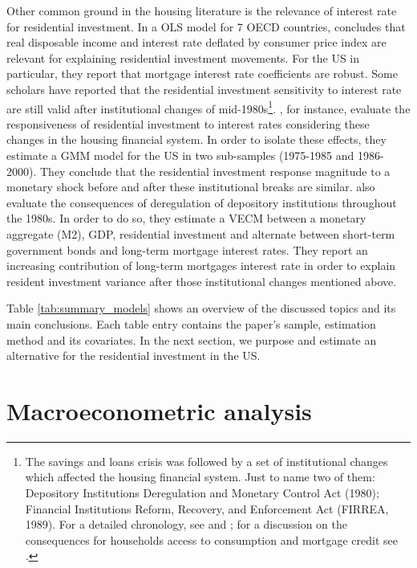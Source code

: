 \documentclass[12pt, a4paper]{article}
\begin{document}
Other common ground in the housing literature is the relevance of interest rate for residential investment.
In a OLS model for 7 OECD countries, \textcite{egebo_1990_MODEL} concludes that real disposable income and interest rate deflated by consumer price index are relevant for explaining residential investment movements.
For the US in particular, they report that mortgage interest rate coefficients are robust.
Some scholars have reported that the residential investment sensitivity to interest rate are still valid after institutional changes of mid-1980s\footnote{The savings and loans crisis was followed by a set of institutional changes which affected the housing financial system. Just to name two of them: Depository Institutions Deregulation and Monetary Control Act (1980); Financial Institutions Reform, Recovery, and Enforcement Act (FIRREA, 1989). For a detailed chronology, see  \textcite[Appendix B]{mccarthyMonetaryPolicyTransmission2002} and \textcite{green_american_2005}; for a discussion on the consequences for households access to consumption and mortgage credit see \textcite{federal_deposit_insurance_corporation_savings_1997,wall_too_2010}.}.
\textcite{mccarthyMonetaryPolicyTransmission2002}, for instance, evaluate the responsiveness of residential investment to interest rates considering these changes in the housing financial system.
In order to isolate these effects, they estimate  a GMM model for the US in two sub-samples (1975-1985 and 1986-2000).
They conclude that the residential investment response magnitude to a monetary shock before and after these institutional breaks are similar.
\textcite{gauger_residential_2003} also evaluate the consequences of deregulation of depository institutions throughout the 1980s.
In order to do so, they estimate a VECM between a monetary aggregate (M2), GDP, residential investment and alternate between short-term government bonds and long-term mortgage interest rates.
They report an increasing contribution of long-term mortgages interest rate in order to explain resident investment variance after those institutional changes mentioned above.


Table \ref{tab:summary_models} shows an overview of the discussed topics and its main conclusions.
Each table entry contains the paper's sample, estimation method and its covariates.
In the next section, we purpose and estimate an alternative for the residential investment in the US.




\section{Macroeconometric analysis}
\label{sec:org31687c3}
\label{sec:VECM}
\end{document}
